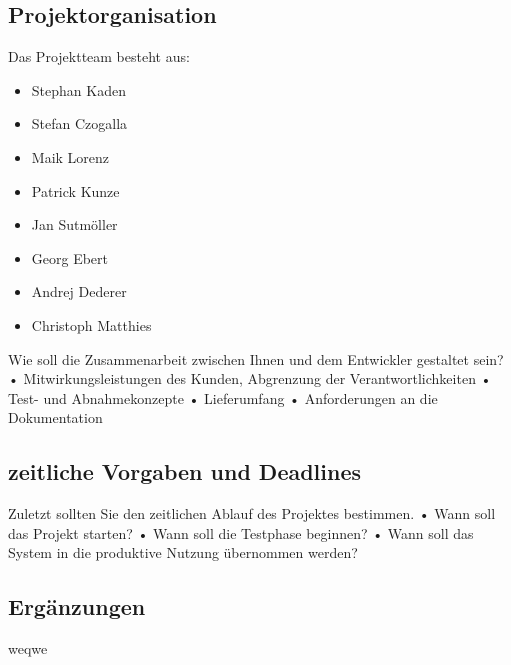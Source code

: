 \subsection{Projektorganisation}

Das Projektteam besteht aus: 

	\begin{itemize}
		\item Stephan Kaden 
		\item Stefan Czogalla
		\item Maik Lorenz
		\item Patrick Kunze
		\item Jan Sutmöller
		\item Georg Ebert
		\item Andrej Dederer
		\item Christoph Matthies
	\end{itemize}
	
	
Wie soll die Zusammenarbeit zwischen Ihnen und dem Entwickler gestaltet sein? 
•	Mitwirkungsleistungen des Kunden, Abgrenzung der Verantwortlichkeiten
•	Test- und Abnahmekonzepte
•	Lieferumfang
•	Anforderungen an die Dokumentation

\subsection{zeitliche Vorgaben und Deadlines}

Zuletzt sollten Sie den zeitlichen Ablauf des Projektes bestimmen. 
•	Wann soll das Projekt starten?
•	Wann soll die Testphase beginnen? 
•	Wann soll das System in die produktive Nutzung übernommen werden?

\subsection{Ergänzungen}

weqwe
